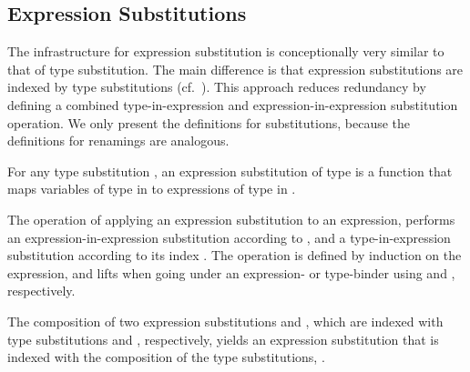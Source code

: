 \documentclass[sigplan,anonymous,review,screen]{acmart}
\begin{document}
\subsection{Expression Substitutions}
\label{sec:substitutions:expr}

The infrastructure for expression substitution is conceptionally very similar to
that of type substitution.
The main difference is that expression substitutions are indexed by
type substitutions (cf.~\cite{DBLP:conf/mpc/ChapmanKNW19}).
This approach reduces redundancy by defining a combined type-in-expression and
expression-in-expression substitution operation.
We only present the definitions for substitutions, because
the definitions for renamings are analogous.

For any type substitution , an expression substitution of
type  is a function that maps variables of type  in
 to expressions of type  in .
\SubDefESub

The operation {\AEsub} of applying an expression substitution  to an expression,
performs an expression-in-expression substitution according to ,
and a type-in-expression substitution according to its index .
The operation is defined by induction on the expression, and lifts  when
going under an expression- or type-binder using {\AEliftS} and
{\AEliftSL}, respectively.
\SubDefEsub




The composition of two expression substitutions  and , which
are indexed with type substitutions  and
, respectively, yields an expression substitution that
is indexed with the composition of the type substitutions,
.
\SubstExamplesECompSS
\end{document}
